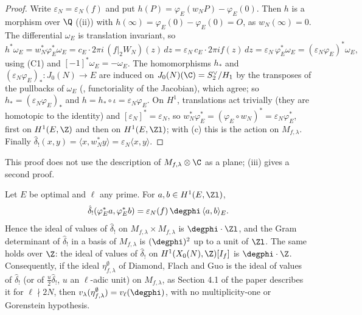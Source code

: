 \begin{proof}
Write $\varepsilon_N=\varepsilon_N(f)$ and put $h(P)=\varphi_E(w_NP)-\varphi_E(0)$. Then $h$ is a morphism over $\Q$ ((ii)) with $h(\infty)=\varphi_E(0)-\varphi_E(0)=O$, as
$w_N(\infty)=0$. The differential $\omega_E$ is translation invariant, so
\[
h^*\omega_E=w_N^*\varphi_E^*\omega_E=c_E\cdot2\pi i\,(f|_2W_N)(z)\,dz=\varepsilon_N\,c_E\cdot2\pi if(z)\,dz=\varepsilon_N\,\varphi_E^*\omega_E=(\varepsilon_N\varphi_E)^*\omega_E,
\]
using (C1) and $[-1]^*\omega_E=-\omega_E$. The homomorphisms $h_*$ and $(\varepsilon_N\varphi_E)_*\colon J_0(N)\to E$ are induced on $J_0(N)(\C)=S_2^\vee/H_1$ by the transposes of the
pullbacks of $\omega_E$ (, functoriality of the Jacobian), which agree; so $h_*=(\varepsilon_N\varphi_E)_*$ and $h=h_*\circ\iota=\varepsilon_N\varphi_E$. On $H^1$, translations act trivially
(they are homotopic to the identity) and $[\varepsilon_N]^*=\varepsilon_N$, so $w_N^*\varphi_E^*=(\varphi_E\circ w_N)^*=\varepsilon_N\varphi_E^*$, first on $H^1(E,\Z)$ and then on $H^1(E,\Zl)$; with
(c) this is the action on $M_{f,\lambda}$. Finally $\hat\delta_!(x,y)=\langle x,w_N^*y\rangle=\varepsilon_N\langle x,y\rangle$.
\end{proof}

This proof does not use the description of $M_{f,\lambda}\otimes\C$ as a plane; (iii) gives a second proof.

\begin{theorem}\label{thm:moddeg:degree-is-eta}
Let $E$ be optimal and $\ell$ any prime. For $a,b\in H^1(E,\Zl)$,
\[
\hat\delta_!(\varphi_E^*a,\varphi_E^*b)=\varepsilon_N(f)\,\degphi\,\langle a,b\rangle_E .
\]
Hence the ideal of values of $\hat\delta_!$ on $M_{f,\lambda}\times M_{f,\lambda}$ is $\degphi\cdot\Zl$, and the Gram determinant of $\hat\delta_!$ in a basis of $M_{f,\lambda}$ is $(\degphi)^2$ up to a unit of $\Zl$.
The same holds over $\Z$: the ideal of values of $\hat\delta_!$ on $H^1(X_0(N),\Z)[I_f]$ is $\degphi\cdot\Z$. Consequently, if the ideal $\eta^\emptyset_{f,\lambda}$ of Diamond, Flach and Guo is the
ideal of values of $\hat\delta_!$ (or of $\frac u2\hat\delta_!$, $u$ an $\ell$-adic unit) on $M_{f,\lambda}$, as Section 4.1 of the paper describes it for $\ell\nmid2N$, then
$v_\lambda(\eta^\emptyset_{f,\lambda})=v_\ell(\degphi)$, with no multiplicity-one or Gorenstein hypothesis.
\end{theorem}

